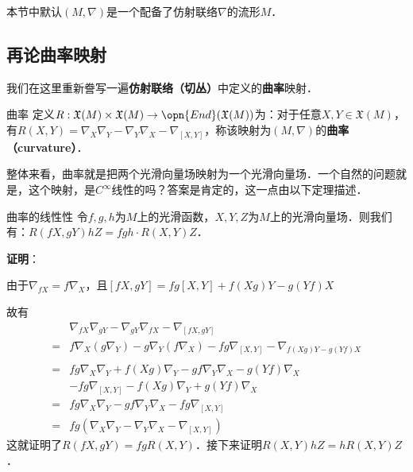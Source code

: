 

本节中默认$(M, \nabla)$是一个配备了仿射联络$\nabla$的流形$M$．

\subsection{再论曲率映射}

我们在这里重新誊写一遍\textbf{仿射联络（切丛）}中定义的\textbf{曲率}映射．

\begin{definition}{曲率}
定义$R:\mathfrak{X}(M)\times\mathfrak{X}(M)\to\opn{End}(\mathfrak{X}(M))$为：对于任意$X, Y\in\mathfrak{X}(M)$，有$R(X, Y)=\nabla_X\nabla_Y-\nabla_Y\nabla_X-\nabla_{[X, Y]}$，称该映射为$(M, \nabla)$的\textbf{曲率（curvature）}．
\end{definition}

整体来看，曲率就是把两个光滑向量场映射为一个光滑向量场．一个自然的问题就是，这个映射，是$C^{\infty}$线性的吗？答案是肯定的，这一点由以下定理描述．

\begin{theorem}{曲率的线性性}\label{RicciC_the1}
令$f, g, h$为$M$上的光滑函数，$X, Y, Z$为$M$上的光滑向量场．则我们有：$R(fX, gY)hZ=fgh\cdot R(X, Y)Z$．
\end{theorem}

\textbf{证明}：

由于$\nabla_{fX}=f\nabla_X$，且$[fX, gY]=fg[X, Y]+f(Xg)Y-g(Yf)X$

故有
\begin{equation}
\begin{aligned}
&\nabla_{fX}\nabla_{gY}-\nabla_{gY}\nabla_{fX}-\nabla_{[fX, gY]}\\=&f\nabla_X(g\nabla_Y)-g\nabla_Y(f\nabla_X)-fg\nabla_{[X, Y]}-\nabla_{f(Xg)Y-g(Yf)X}\\
\\=&fg\nabla_X\nabla_Y+f(Xg)\nabla_Y-gf\nabla_Y\nabla_X-g(Yf)\nabla_X\\&-fg\nabla_{[X, Y]}-f(Xg)\nabla_Y+g(Yf)\nabla_X\\
=&fg\nabla_X\nabla_Y-gf\nabla_Y\nabla_X-fg\nabla_{[X, Y]}\\
=&fg(\nabla_X\nabla_Y-\nabla_Y\nabla_X-\nabla_{[X, Y]})
\end{aligned}
\end{equation}
这就证明了$R(fX, gY)=fgR(X, Y)$．接下来证明$R(X, Y)hZ=hR(X, Y)Z$．

